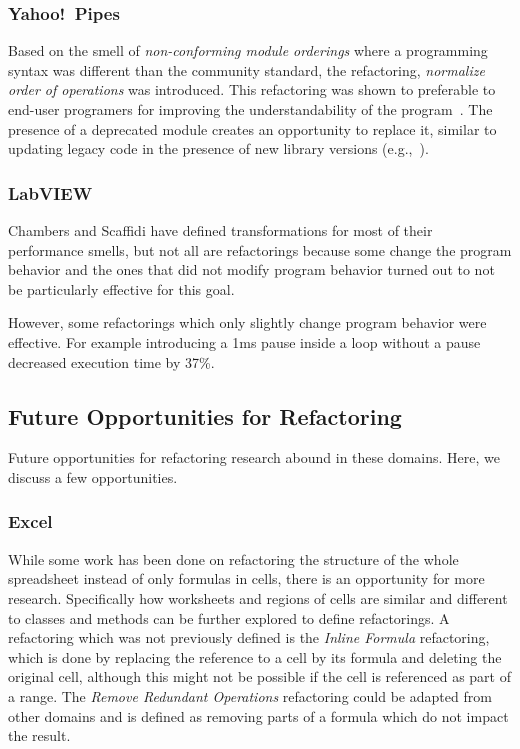 \documentclass[10pt,conference,compsocconf]{IEEEtran}
\begin{document}
\subsubsection{Yahoo!\ Pipes}
\label{sec:yp:domainrefactor}
Based on the smell of \emph{non-conforming module orderings} where a programming syntax was different than the community standard, the refactoring, \emph{normalize order of operations} was introduced. This refactoring was shown to preferable to end-user programers for improving the understandability of the program~\cite{StoleeTSE2013}. 
The presence of a deprecated module creates an opportunity to 
replace it, similar to updating legacy code in the presence of new library versions (e.g.,~\cite{Tansey:2008:ARI:1449955.1449788, Balaban:2005:RSC:1103845.1094832}). 


\subsubsection{LabVIEW}

Chambers and Scaffidi \cite{chambers2015impact} have defined transformations for most of their performance smells, but not all are refactorings because some change the program behavior and the ones that did not modify program behavior turned out to not be particularly effective for this goal.

However, some refactorings which only slightly change program behavior were effective. For example introducing a 1ms pause inside a loop without a pause decreased execution time by 37\%.

\subsection{Future Opportunities for Refactoring}

Future opportunities for refactoring research abound in these domains. Here, we discuss a few opportunities. 

\subsubsection{Excel}

While some work has been done on refactoring the structure of the whole spreadsheet instead of only formulas in cells, there is an opportunity for more research. 
Specifically how worksheets and regions of cells are similar and different to classes and methods can be further explored to define refactorings.
A refactoring which was not previously defined is the \emph{Inline Formula} refactoring, which is done by replacing the reference to a cell by its formula and deleting the original cell, although this might not be possible if the cell is referenced as part of a range.
The \emph{Remove Redundant Operations} refactoring could be adapted from other domains and is defined as removing parts of a formula which do not impact the result.
\end{document}
